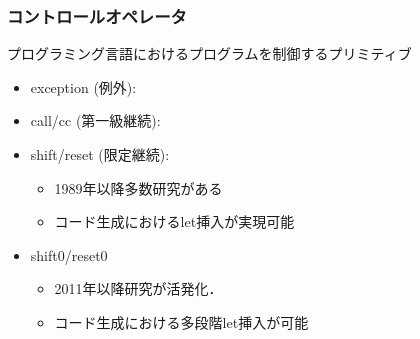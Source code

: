 \documentclass[dvipdfmx,cjk,xcolor=dvipsnames,envcountsect,notheorems,12pt,handout]{beamer} \usepackage{pgfpages} \pgfpagesuselayout{4 on 1}[a4paper,landscape,border shrink=5mm]
\theoremstyle{definition}
\begin{document}
\begin{frame}
  \frametitle{コントロールオペレータ}



  \begin{block}{プログラミング言語におけるプログラムを制御するプリミティブ}
    \begin{itemize}
    \item exception (例外): %
    \item call/cc (第一級継続): %
    \item shift/reset (限定継続): %
      \begin{itemize}
      \item 1989年以降多数研究がある
      \item コード生成におけるlet挿入が実現可能
      \end{itemize}
    \item \alert{shift0/reset0}
      \begin{itemize}
        \item 2011年以降研究が活発化．
        \item コード生成における多段階let挿入が可能
      \end{itemize}
    \end{itemize}
  \end{block}
\end{frame}
\end{document}
